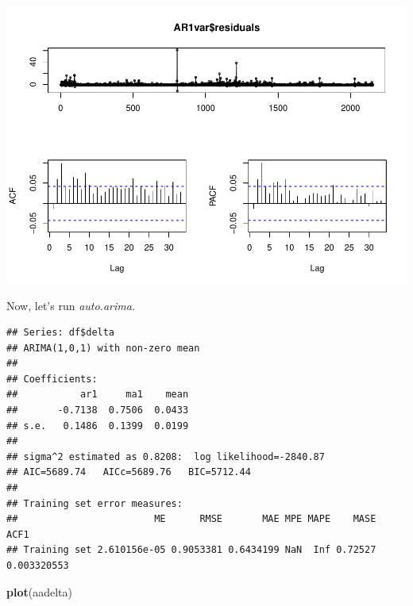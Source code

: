 \documentclass[11pt, a4paper]{report}
\newenvironment{Shaded}{\begin{snugshade}}{\end{snugshade}}
\newcommand{\DataTypeTok}[1]{\textcolor[rgb]{0.13,0.29,0.53}{#1}}
\newcommand{\KeywordTok}[1]{\textcolor[rgb]{0.13,0.29,0.53}{\textbf{#1}}}
\newcommand{\NormalTok}[1]{#1}
\newcommand{\OperatorTok}[1]{\textcolor[rgb]{0.81,0.36,0.00}{\textbf{#1}}}
\newcommand{\StringTok}[1]{\textcolor[rgb]{0.31,0.60,0.02}{#1}}
\theoremstyle{plain}
\theoremstyle{plain}
\theoremstyle{remark}
\begin{document}
\begin{center}\includegraphics{Econo2_P1_files/figure-latex/var1-2} \end{center}

Now, let's run \emph{auto.arima}.

\begin{Shaded}
\end{Shaded}

\begin{verbatim}
## Series: df$delta 
## ARIMA(1,0,1) with non-zero mean 
## 
## Coefficients:
##           ar1     ma1    mean
##       -0.7138  0.7506  0.0433
## s.e.   0.1486  0.1399  0.0199
## 
## sigma^2 estimated as 0.8208:  log likelihood=-2840.87
## AIC=5689.74   AICc=5689.76   BIC=5712.44
## 
## Training set error measures:
##                        ME      RMSE       MAE MPE MAPE    MASE        ACF1
## Training set 2.610156e-05 0.9053381 0.6434199 NaN  Inf 0.72527 0.003320553
\end{verbatim}

\begin{Shaded}
\begin{Highlighting}[]
\KeywordTok{plot}\NormalTok{(aadelta)}
\end{Highlighting}
\end{Shaded}
\end{document}
